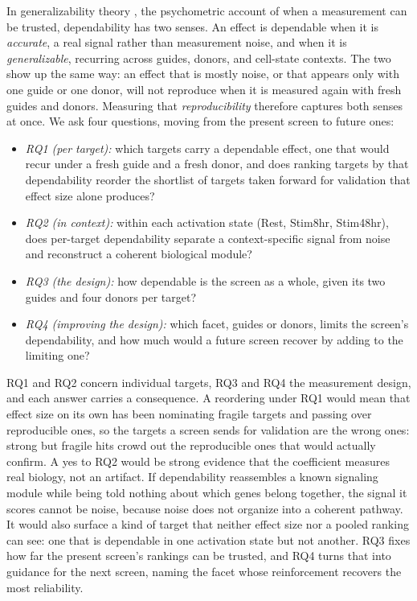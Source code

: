 \documentclass[11pt]{article}
\begin{document}
In generalizability theory \parencite{cronbach1972}, the psychometric account of when
a measurement can be trusted, dependability has two senses. An effect is dependable
when it is \emph{accurate}, a
real signal rather than measurement noise, and when it is \emph{generalizable},
recurring across guides, donors, and cell-state contexts. The two show up the same way: an effect that is mostly noise, or that appears only
with one guide or one donor, will not reproduce when it is measured again with fresh
guides and donors. Measuring that \emph{reproducibility} therefore captures both senses at
once. We ask four
questions, moving from the present screen to future ones:
\begin{itemize}
  \item \emph{RQ1 (per target):} which targets carry a dependable effect, one that
  would recur under a fresh guide and a fresh donor, and does ranking targets by that
  dependability reorder the shortlist of targets taken forward for validation
  that effect size alone produces?
  \item \emph{RQ2 (in context):} within each activation state (Rest, Stim8hr,
  Stim48hr), does per-target dependability separate a context-specific signal from
  noise and reconstruct a coherent biological module?
  \item \emph{RQ3 (the design):} how dependable is the screen as a whole, given its
  two guides and four donors per target?
  \item \emph{RQ4 (improving the design):} which facet, guides or donors, limits the
  screen's dependability, and how much would a future screen recover by adding to the
  limiting one?
\end{itemize}
RQ1 and RQ2 concern individual targets, RQ3 and RQ4 the measurement design, and each
answer carries a consequence. A reordering under RQ1 would mean that effect size on
its own has been nominating fragile targets and passing over reproducible ones, so
the targets a screen sends for validation are the wrong ones: strong but fragile hits
crowd out the reproducible ones that would actually confirm. A yes to RQ2 would be strong
evidence that the coefficient measures real biology, not an artifact. If
dependability reassembles a known signaling module while being told nothing about
which genes belong together, the signal it scores cannot be noise, because noise does
not organize into a coherent pathway. It would also surface a kind of target that
neither effect size nor a pooled ranking can see: one that is dependable in one
activation state but not another. RQ3 fixes how far the present screen's rankings
can be trusted, and RQ4 turns that into guidance for the next screen, naming the
facet whose reinforcement recovers the most reliability.
\end{document}
